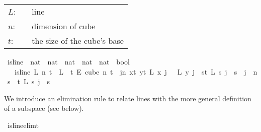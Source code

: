 \begin{isabellebody}
\begin{isamarkuptext}
\begin{tabular}{llp{8cm}}
$L$:& \isa{nat\ {\isasymRightarrow}\ {\isacharparenleft}{\kern0pt}nat\ {\isasymRightarrow}\ nat{\isacharparenright}{\kern0pt}}& line\\
$n$:& \isa{nat}& dimension of cube\\
$t$:&  \isa{nat}& the size of the cube's base\\
\end{tabular}%
\end{isamarkuptext}\isamarkuptrue%
\isamarkupfalse%
\ is{\isacharunderscore}{\kern0pt}line\ {\isacharcolon}{\kern0pt}{\isacharcolon}{\kern0pt}\ {\isachardoublequoteopen}{\isacharparenleft}{\kern0pt}nat\ {\isasymRightarrow}\ {\isacharparenleft}{\kern0pt}nat\ {\isasymRightarrow}\ nat{\isacharparenright}{\kern0pt}{\isacharparenright}{\kern0pt}\ {\isasymRightarrow}\ nat\ {\isasymRightarrow}\ nat\ {\isasymRightarrow}\ bool{\isachardoublequoteclose}\isanewline
\ \ \ {\isachardoublequoteopen}is{\isacharunderscore}{\kern0pt}line\ L\ n\ t\ {\isasymequiv}\ {\isacharparenleft}{\kern0pt}L\ {\isasymin}\ {\isacharbraceleft}{\kern0pt}{\isachardot}{\kern0pt}{\isachardot}{\kern0pt}{\isacharless}{\kern0pt}t{\isacharbraceright}{\kern0pt}\ {\isasymrightarrow}\isactrlsub E\ cube\ n\ t\ {\isasymand}\ {\isacharparenleft}{\kern0pt}{\isacharparenleft}{\kern0pt}{\isasymforall}j{\isacharless}{\kern0pt}n{\isachardot}{\kern0pt}\ {\isacharparenleft}{\kern0pt}{\isasymforall}x{\isacharless}{\kern0pt}t{\isachardot}{\kern0pt}\ {\isasymforall}y{\isacharless}{\kern0pt}t{\isachardot}{\kern0pt}\ L\ x\ j\ {\isacharequal}{\kern0pt}\ \ L\ y\ j{\isacharparenright}{\kern0pt}\ {\isasymor}\ {\isacharparenleft}{\kern0pt}{\isasymforall}s{\isacharless}{\kern0pt}t{\isachardot}{\kern0pt}\ L\ s\ j\ {\isacharequal}{\kern0pt}\ s{\isacharparenright}{\kern0pt}{\isacharparenright}{\kern0pt}\ {\isasymand}\ {\isacharparenleft}{\kern0pt}{\isasymexists}j\ {\isacharless}{\kern0pt}\ n{\isachardot}{\kern0pt}\ {\isacharparenleft}{\kern0pt}{\isasymforall}s\ {\isacharless}{\kern0pt}\ t{\isachardot}{\kern0pt}\ L\ s\ j\ {\isacharequal}{\kern0pt}\ s{\isacharparenright}{\kern0pt}{\isacharparenright}{\kern0pt}{\isacharparenright}{\kern0pt}{\isacharparenright}{\kern0pt}{\isachardoublequoteclose}%
\begin{isamarkuptext}%
We introduce an elimination rule to relate lines with the more general definition of a subspace (see below).%
\end{isamarkuptext}\isamarkuptrue%
\isamarkupfalse%
\ is{\isacharunderscore}{\kern0pt}line{\isacharunderscore}{\kern0pt}elim{\isacharunderscore}{\kern0pt}t{\isacharunderscore}{\kern0pt}{}{\isacharcolon}{\kern0pt}\isanewline

\end{isabellebody}
